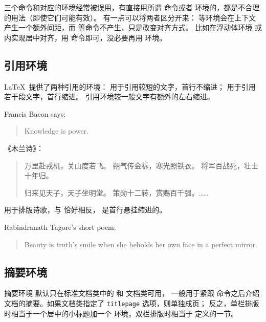 三个命令和对应的环境经常被误用，有直接用所谓  命令或者  环境的，都是不合理的用法（即使它们可能有效）。
有一点可以将两者区分开来： 等环境会在上下文产生一个额外间距，而  等命令不产生，只是改变对齐方式。
比如在浮动体环境  或  内实现居中对齐，用  命令即可，没必要再用  环境。

\subsection{引用环境}\label{subsec:quote}

\LaTeX\ 提供了两种引用的环境： 用于引用较短的文字，首行不缩进； 用于引用若干段文字，首行缩进。
引用环境较一般文字有额外的左右缩进。
\begin{example}
Francis Bacon says:
\begin{quote}
Knowledge is power.
\end{quote}
\end{example}

\begin{example}
《木兰诗》：
\begin{quotation}
万里赴戎机，关山度若飞。
朔气传金柝，寒光照铁衣。
将军百战死，壮士十年归。

归来见天子，天子坐明堂。
策勋十二转，赏赐百千强。……
\end{quotation}
\end{example}

 用于排版诗歌，与  恰好相反， 是首行悬挂缩进的。
\begin{example}
Rabindranath Tagore's short poem:
\begin{verse}
Beauty is truth’s smile 
when she beholds her own face in 
a perfect mirror.
\end{verse}
\end{example}

\subsection{摘要环境}\label{subsec:abstract}

摘要环境  默认只在标准文档类中的  和  文档类可用，
一般用于紧跟  命令之后介绍文档的摘要。如果文档类指定了 \texttt{titlepage} 选项，则单独成页；
反之，单栏排版时相当于一个居中的小标题加一个  环境，双栏排版时相当于  定义的一节。

